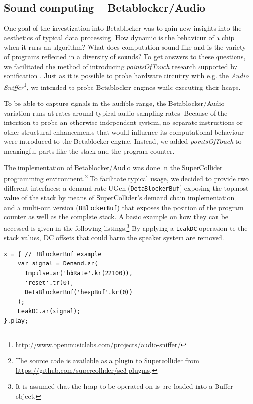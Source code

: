 \documentclass[letterpaper, 12pt]{article}
\begin{document}
\subsection{Sound computing -- Betablocker/Audio} 
\label{sub:sound_computing}

One goal of the investigation into Betablocker was to gain new insights into the aesthetics of typical data processing.
How dynamic is the behaviour of a chip when it runs an algorithm?
What does computation sound like and is the variety of programs reflected in a diversity of sounds?
To get answers to these questions, we facilitated the method of introducing \emph{pointsOfTouch} research supported by sonification \citep{bovermann2011-the}.
Just as it is possible to probe hardware circuitry with e.g. the \emph{Audio Sniffer}\footnote{\url{http://www.openmusiclabs.com/projects/audio-sniffer/}}, we intended to probe Betablocker engines while executing their heaps.

To be able to capture signals in the audible range, the Betablocker/Audio variation runs at rates around typical audio sampling rates.
Because of the intention to probe an otherwise independent system, no separate instructions or other structural enhancements that would influence its computational behaviour were introduced to the Betablocker engine.
Instead, we added \emph{pointsOfTouch} to meaningful parts like the stack and the program counter.

The implementation of Betablocker/Audio was done in the SuperCollider programming environment.\footnote{The source code is available as a plugin to Supercollider from  \url{https://github.com/supercollider/sc3-plugins}.}
To facilitate typical usage, we decided to provide two different interfaces: a demand-rate UGen (\texttt{DetaBlockerBuf}) exposing the topmost value of the stack by means of SuperCollider's demand chain implementation, and a multi-out version (\texttt{BBlockerBuf}) that exposes the position of the program counter as well as  the complete stack.
A basic example on how they can be accessed is given in the following listings.\footnote{
It is assumed that the heap to be operated on is pre-loaded into a Buffer object.
}
By applying a \texttt{LeakDC} operation to the stack values, DC offsets that could harm the speaker system are removed.


\begin{Verbatim}[fontfamily=courier, xleftmargin=\parindent]
x = { // BBlockerBuf example
	var signal = Demand.ar(
	  Impulse.ar('bbRate'.kr(22100)), 
	  'reset'.tr(0),
	  DetaBlockerBuf('heapBuf'.kr(0))
	);
	LeakDC.ar(signal);
}.play;
\end{Verbatim}
\end{document}
